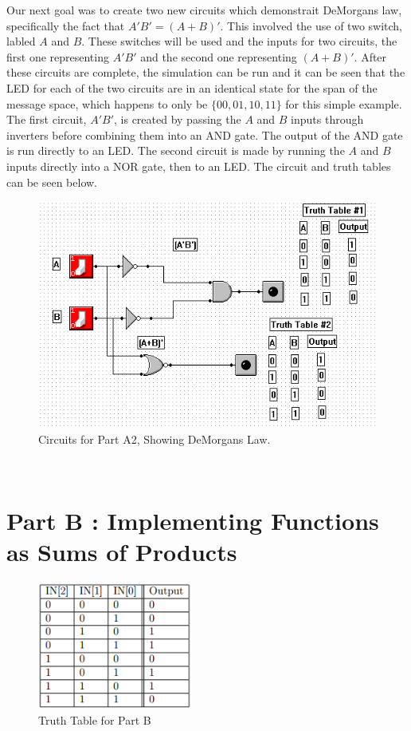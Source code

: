 \documentclass[a4paper,11pt]{article}
\begin{document}
Our next goal was to create two new circuits which demonstrait DeMorgans law, specifically the fact that \(A'B' = (A+B)'\). This involved the use of two switch, labled $A$ and $B$. These switches will be used and the inputs for two circuits, the first one representing $A'B'$ and the second one representing $(A+B)'$. After these circuits are complete, the simulation can be run and it can be seen that the LED for each of the two circuits are in an identical state for the span of the message space, which happens to only be $ \lbrace 00, 01, 10, 11 \rbrace $ for this simple example. The first circuit, $A'B'$, is created by passing the $A$ and $B$ inputs through inverters before combining them into an AND gate. The output of the AND gate is run directly to an LED. The second circuit is made by running the $A$ and $B$ inputs directly into a NOR gate, then to an LED. The circuit and truth tables can be seen below. \\
\begin{figure}[h!]
   \centering
     \includegraphics[width=5in]{PartADM}
   \caption{Circuits for Part A2, Showing DeMorgans Law.}
   \label{fig:parta2}
\end{figure}  \\




\section{Part B : Implementing Functions as Sums of Products}
\begin{figure}[h!]
   \centering
     \includegraphics[width=2in]{PartBTT}
   \caption{Truth Table for Part B}
   \label{fig:partbtt}
\end{figure} 
\end{document}
